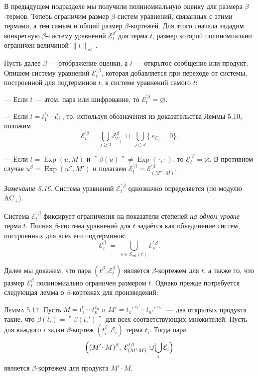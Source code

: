 В предыдущем подразделе мы получили полиномиальную оценку
для размера $\beta$-термов.
Теперь ограничим размер $\beta$-систем уравнений,
связанных с этими термами, а тем самым и общий размер
$\beta$-кортежей.
Для этого сначала зададим конкретную $\beta$-систему уравнений
$\mathcal E_{t}^{\beta}$ для терма $t$,
размер которой полиномиально ограничен величиной $\lVert t\rVert_{\text{ext}}$.

Пусть далее $\beta$ — отображение оценки, а $t$ — открытое сообщение
или продукт. Опишем систему уравнений
$\mathcal E_{t}^{\prime\,\beta}$, которая добавляется
при переходе от системы, построенной для подтерминов $t$,
к системе уравнений самого $t$:

\medskip
— Если $t$ — атом, пара или шифрование, то $\mathcal E_{t}^{'\beta}=\varnothing$.

— Если $t=t_{1}^{e_{1}}\!\cdots t_{n}^{e_{n}}$, то, используя обозначения
из доказательства Леммы 5.10, положим
\[
      \mathcal E_{t}^{'\beta}
      =\bigcup_{j\ge2}\mathcal E_{C_{j}}^{\beta}
       \;\cup\;
       \bigcup_{j\in J}\{\,e_{C_{j}}=0\}.
\]

— Если $t=\operatorname{Exp}(u,M)$ и
  $\ulcorner\beta(u)\urcorner\neq\operatorname{Exp}(\,\cdot,\cdot\,)$,
  то $\mathcal E_{t}^{'\beta}=\varnothing$.
  В противном случае $u^{\beta}=\operatorname{Exp}(u'',M')$ и
  полагаем $\mathcal E_{t}^{'\beta}=\mathcal E_{(M''\!\cdot M)}^{'\beta}$.

\textit{Замечание 5.16.}
Система уравнений $\mathcal E_{t}^{\prime\,\beta}$ однозначно определяется
(по модулю AC\textsubscript{+}).

Система $\mathcal E_{t}^{\prime\,\beta}$ фиксирует ограничения
на показатели степеней \emph{на одном уровне} терма $t$.
Полная $\beta$-система уравнений для $t$ задаётся как объединение
систем, построенных для всех его подтерминов:
\[
  \mathcal E_{t}^{\beta}
  \;=\;
  \bigcup_{s\in S_{\text{ext}}(t)} \mathcal E_{s}^{\prime\,\beta}.
\]

Далее мы докажем, что пара $(t^{\beta},\mathcal E_{t}^{\beta})$
является $\beta$-кортежем для $t$, а также то, что размер
$\mathcal E_{t}^{\beta}$ полиномиально ограничен размером $t$.
Однако прежде потребуется следующая лемма о $\beta$-кортежах
для произведений:

\textsc{Лемма 5.17.}
Пусть 
\(M = t_{1}^{e_{1}}\!\cdots t_{n}^{e_{n}}\)
и
\(M' = t_{1}'^{\,e_{1}'}\!\cdots t_{n'}'^{\,e_{n'}'}\) —
два открытых продукта такие, что 
\(\beta(t_{i}) = \ulcorner\beta(t_{i}')\urcorner\)
для всех соответствующих множителей.
Пусть для каждого \(i\) задан $\beta$-кортеж 
\((t_{i}^{\beta},\mathcal E_{i})\) терма \(t_{i}\).
Тогда пара
\[
\Bigl((M'\!\cdot M)^{\beta},\;
      \mathcal E_{(M'\!\cdot M)}^{\prime\,\beta}
      \,\cup\!
      \bigcup_{i}\mathcal E_{i}\Bigr)
\]
является $\beta$-кортежем для продукта \(M'\!\cdot M\).


